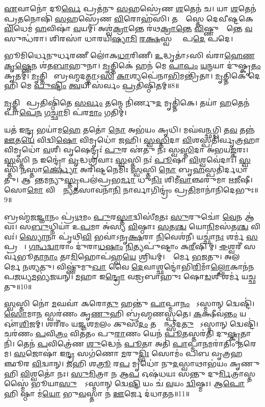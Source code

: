 \ul{𑌏}𑌵𑌾𑌨𑍋॑ 𑌦𑍂\ul{𑌰𑍍𑌵𑍇} 𑌪𑍍𑌰𑌤॑𑌨𑍁 \ul{𑌸}𑌹𑌸𑍍𑌰𑍇॑𑌣 \ul{𑌶}𑌤𑍇𑌨॑ 𑌚। 
𑌯𑌾 \ul{𑌶}𑌤𑍇𑌨॑ 𑌪𑍍𑌰\ul{𑌤}𑌨𑍋𑌷𑌿॑ \ul{𑌸}𑌹𑌸𑍍𑌰𑍇॑𑌣 \ul{𑌵𑌿}𑌰𑍋𑌹॑𑌸𑌿। 
𑌤𑌸𑍍𑌯𑌾᳚𑌸𑍍𑌤𑍇 𑌦𑍇𑌵𑍀𑌷𑍍𑌟𑌕𑍇 \ul{𑌵𑌿}𑌧𑍇𑌮॑ \ul{𑌹}𑌵𑌿𑌷𑌾॑ \ul{𑌵}𑌯𑌮𑍍। 
𑌅𑌶𑍍𑌵॑\ul{𑌕𑍍𑌰𑌾}𑌨𑍍𑌤𑍇 𑌰॑𑌥\ul{𑌕𑍍𑌰𑌾}\ul{𑌨𑍍𑌤𑍇} \ul{𑌵𑌿}𑌷𑍍𑌣𑍁𑌕𑍍𑌰𑌾᳚𑌨𑍍𑌤𑍇 \ul{𑌵}𑌸𑍁𑌨𑍍𑌧॑𑌰𑌾। 
𑌶𑌿𑌰𑌸𑌾॑ 𑌧𑌾𑌰𑌯𑌿\ul{𑌷𑍍𑌯𑌾}\ul{𑌮𑌿} \ul{𑌰}\ul{𑌕𑍍𑌷}𑌸𑍍𑌵 𑌮𑌾𑌂᳚ 𑌪\ul{𑌦𑍇} 𑌪𑌦𑍇।

 𑌭𑍂𑌮𑌿𑌰𑍍𑌧𑍇𑌨𑍁𑌰𑍍𑌧𑌰𑌣𑍀 𑌲𑍋॑𑌕\ul{𑌧𑌾}𑌰𑌿𑌣𑍀। 
 \ul{𑌉}𑌦𑍍𑌧𑍃𑌤𑌾॑𑌽𑌸𑌿 𑌵॑𑌰𑌾\ul{𑌹𑍇}\ul{𑌣} \ul{𑌕𑍃}\ul{𑌷𑍍𑌣𑍇}𑌨 𑌶॑𑌤\ul{𑌬𑌾}𑌹𑍁𑌨𑌾। 
 \ul{𑌮𑍃}𑌤𑍍𑌤𑌿𑌕𑍇॑ 𑌹𑌨॑ 𑌮𑍇 \ul{𑌪𑌾}\ul{𑌪𑌂} \ul{𑌯}\ul{𑌨𑍍𑌮}𑌯𑌾 𑌦𑍁॑𑌷𑍍𑌕𑍃\ul{𑌤𑌂} 𑌕𑍃𑌤𑌮𑍍। 
 \ul{𑌮𑍃}𑌤𑍍𑌤𑌿𑌕𑍇᳚ 𑌬𑍍𑌰𑌹𑍍𑌮𑌦\ul{𑌤𑍍𑌤𑌾}𑌽\ul{𑌸𑌿} \ul{𑌕𑌾}𑌶𑍍𑌯𑌪𑍇॑𑌨𑌾\ul{𑌭𑌿}𑌮𑌨𑍍𑌤𑍍𑌰𑌿॑𑌤𑌾। 
 \ul{𑌮𑍃}𑌤𑍍𑌤𑌿𑌕𑍇॑ 𑌦𑍇𑌹𑌿॑ 𑌮𑍇 \ul{𑌪𑍁}\ul{𑌷𑍍𑌟𑌿𑌂} \ul{𑌤𑍍𑌵}𑌯𑌿 𑌸॑𑌰𑍍𑌵𑌂 \ul{𑌪𑍍𑌰}𑌤𑌿𑌷𑍍𑌠𑌿॑𑌤𑌮𑍍॥8॥
 
 \ul{𑌮𑍃}𑌤𑍍𑌤𑌿𑌕𑍇᳚ 𑌪𑍍𑌰𑌤𑌿𑌷𑍍𑌠𑌿॑𑌤𑍇 \ul{𑌸}\ul{𑌰𑍍𑌵𑌂} \ul{𑌤}𑌨𑍍𑌮𑍇 𑌨𑌿॑𑌰𑍍𑌣𑍁\ul{𑌦} 𑌮𑍃𑌤𑍍𑌤𑌿॑𑌕𑍇। 
 𑌤𑌯𑌾॑ \ul{𑌹}𑌤𑍇𑌨॑ 𑌪𑌾\ul{𑌪𑍇}\ul{𑌨} \ul{𑌗}\ul{𑌚𑍍𑌛𑌾}𑌮𑌿 𑌪॑𑌰\ul{𑌮𑌾𑌂} 𑌗𑌤𑌿𑌮𑍍।

𑌯𑌤॑ 𑌇\ul{𑌨𑍍𑌦𑍍𑌰} 𑌭𑌯𑌾॑𑌮\ul{𑌹𑍇} 𑌤𑌤𑍋॑ \ul{𑌨𑍋} 𑌅𑌭॑𑌯𑌂 𑌕𑍃𑌧𑌿। 
𑌮𑌘॑𑌵\ul{𑌨𑍍𑌛}𑌗𑍍𑌧𑌿 𑌤\ul{𑌵} 𑌤𑌨𑍍𑌨॑ \ul{𑌊}𑌤\ul{𑌯𑍇} 𑌵𑌿𑌦𑍍𑌵𑌿\ul{𑌷𑍋} 𑌵𑌿𑌮𑍃𑌧𑍋॑ 𑌜𑌹𑌿। 
\ul{𑌸𑍍𑌵}\ul{𑌸𑍍𑌤𑌿}𑌦𑌾 \ul{𑌵𑌿}𑌶𑌸𑍍𑌪𑌤𑌿॑𑌰𑍍𑌵𑍃\ul{𑌤𑍍𑌰}𑌹𑌾 𑌵𑌿𑌮𑍃𑌧𑍋॑ \ul{𑌵}𑌶𑍀। 
𑌵𑍃𑌷𑍇𑌨𑍍𑌦𑍍𑌰𑌃॑ \ul{𑌪𑍁}𑌰 𑌏॑𑌤𑍁 𑌨𑌃 𑌸𑍍𑌵\ul{𑌸𑍍𑌤𑌿}𑌦𑌾 𑌅॑𑌭𑌯\ul{𑌙𑍍𑌕}𑌰𑌃। 
\ul{𑌸𑍍𑌵}𑌸𑍍𑌤𑌿 \ul{𑌨} 𑌇𑌨𑍍𑌦𑍍𑌰𑍋॑ \ul{𑌵𑍃}𑌦𑍍𑌧𑌶𑍍𑌰॑𑌵𑌾𑌃 \ul{𑌸𑍍𑌵}𑌸𑍍𑌤𑌿 𑌨𑌃॑ \ul{𑌪𑍂}𑌷𑌾 \ul{𑌵𑌿}𑌶𑍍𑌵𑌵𑍇॑𑌦𑌾𑌃। 
\ul{𑌸𑍍𑌵}𑌸𑍍𑌤𑌿 \ul{𑌨}𑌸𑍍𑌤𑌾\ul{𑌰𑍍𑌕𑍍𑌷𑍍𑌯𑍋} 𑌅𑌰𑌿॑𑌷𑍍𑌟𑌨𑍇𑌮𑌿𑌃 \ul{𑌸𑍍𑌵}𑌸𑍍𑌤𑌿 \ul{𑌨𑍋} 𑌬𑍃\ul{𑌹}𑌸𑍍𑌪𑌤𑌿॑𑌰𑍍𑌦𑌧𑌾𑌤𑍁। 
𑌆𑌪𑌾᳚𑌨𑍍𑌤𑌮𑌨𑍍𑌯𑍁\ul{𑌸𑍍𑌤𑍃}𑌪𑌲॑𑌪𑍍𑌰𑌭\ul{𑌰𑍍𑌮𑌾} 𑌧𑍁\ul{𑌨𑌿𑌃} 𑌶𑌿𑌮𑍀॑\ul{𑌵𑌾}𑌞𑍍𑌛𑌰𑍁॑𑌮𑌾 𑌋\ul{𑌜𑍀}𑌷𑍀। 
𑌸𑍋\ul{𑌮𑍋} 𑌵𑌿𑌶𑍍𑌵𑌾᳚𑌨𑍍𑌯\ul{𑌤}𑌸𑌾𑌵𑌨𑌾॑\ul{𑌨𑌿} 𑌨𑌾𑌰𑍍𑌵𑌾𑌗𑌿𑌨𑍍𑌦𑍍𑌰𑌂॑ 𑌪𑍍𑌰\ul{𑌤𑌿}𑌮𑌾𑌨𑌾॑𑌨𑌿𑌦𑍇𑌭𑍁𑌃॥9॥

𑌬𑍍𑌰𑌹𑍍𑌮॑𑌜\ul{𑌜𑍍𑌞𑌾}𑌨𑌂 𑌪𑍍𑌰॑\ul{𑌥}𑌮𑌂 \ul{𑌪𑍁}𑌰\ul{𑌸𑍍𑌤𑌾}𑌦𑍍𑌵𑌿𑌸𑍀॑\ul{𑌮}𑌤𑌃 \ul{𑌸𑍁}𑌰𑍁𑌚𑍋॑ \ul{𑌵𑍇}𑌨 𑌆॑𑌵𑌃। 
𑌸\ul{𑌬𑍁}𑌧𑍍𑌨𑌿𑌯𑌾॑ 𑌉\ul{𑌪}𑌮𑌾 𑌅॑𑌸𑍍𑌯 \ul{𑌵𑌿}𑌷𑍍𑌠𑌾𑌃 \ul{𑌸}𑌤\ul{𑌶𑍍𑌚} 𑌯𑍋\ul{𑌨𑌿}𑌮𑌸॑𑌤\ul{𑌶𑍍𑌚} 𑌵𑌿𑌵𑌃॑। 
\ul{𑌸𑍍𑌯𑍋}𑌨𑌾 𑌪𑍃॑𑌥𑌿\ul{𑌵𑌿} 𑌭𑌵𑌾॑𑌽𑌨𑍃\ul{𑌕𑍍𑌷}𑌰𑌾 \ul{𑌨𑌿}𑌵𑍇𑌶॑𑌨𑍀। 
𑌯𑌚𑍍𑌛𑌾॑\ul{𑌨𑌃} 𑌶𑌰𑍍𑌮॑ \ul{𑌸}𑌪𑍍𑌰𑌥𑌾𑌃᳚। 
\ul{𑌗}\ul{𑌨𑍍𑌧}\ul{𑌦𑍍𑌵𑌾}𑌰𑌾𑌂 𑌦𑍁॑𑌰𑌾\ul{𑌧}\ar{}\ul{𑌷𑌾𑌂} \ul{𑌨𑌿}𑌤𑍍𑌯𑌪𑍁॑𑌷𑍍𑌟𑌾𑌂 𑌕\ul{𑌰𑍀}𑌷𑌿𑌣𑍀᳚𑌮𑍍। 
\ul{𑌈}𑌶𑍍𑌵𑌰𑍀॑ 𑌸𑌰𑍍𑌵॑𑌭𑍂\ul{𑌤𑌾}\ul{𑌨𑌾𑌂} 𑌤𑌾\ul{𑌮𑌿}𑌹𑍋𑌪॑𑌹𑍍𑌵\ul{𑌯𑍇} 𑌶𑍍𑌰𑌿𑌯𑌮𑍍। 
𑌶𑍍𑌰𑍀᳚𑌰𑍍𑌮𑍇 \ul{𑌭}𑌜𑌤𑍁। 
𑌅𑌲𑌕𑍍𑌷𑍍𑌮𑍀᳚𑌰𑍍𑌮𑍇 \ul{𑌨}𑌶𑍍𑌯𑌤𑍁। 
𑌵𑌿𑌷𑍍𑌣𑍁॑𑌮𑍁\ul{𑌖𑌾} 𑌵𑍈 \ul{𑌦𑍇}𑌵𑌾𑌶𑍍𑌛𑌨𑍍𑌦𑍋॑𑌭𑌿\ul{𑌰𑌿}𑌮𑌾𑌁\ul{𑌲𑍍𑌲𑍋}𑌕𑌾𑌨॑𑌨𑌪\-\ul{𑌜}𑌯𑍍𑌯\ul{𑌮}𑌭𑍍𑌯॑𑌜𑌯𑌨𑍍। 
\ul{𑌮}𑌹𑌾 𑌇\ul{𑌨𑍍𑌦𑍍𑌰𑍋} 𑌵𑌜𑍍𑌰𑌬𑌾𑌹𑍁𑌃 𑌷𑍋\ul{𑌡}𑌶𑍀 𑌶𑌰𑍍𑌮॑ 𑌯𑌚𑍍𑌛𑌤𑍁॥10॥

 \ul{𑌸𑍍𑌵}𑌸𑍍𑌤𑌿 𑌨𑍋॑ \ul{𑌮}𑌘𑌵𑌾॑ 𑌕𑌰𑍋\ul{𑌤𑍁} 𑌹𑌨𑍍𑌤𑍁॑ \ul{𑌪𑌾}𑌪𑍍𑌮𑌾\ul{𑌨𑌂} 𑌯𑍋᳚𑌽𑌸𑍍𑌮𑌾𑌨𑍍 𑌦𑍍𑌵𑍇𑌷𑍍𑌟𑌿॑। 
 \ul{𑌸𑍋}𑌮𑌾\ul{𑌨}\ul{} 𑌸𑍍𑌵𑌰॑𑌣𑌂 𑌕𑍃\ul{𑌣𑍁}𑌹𑌿 𑌬𑍍𑌰॑𑌹𑍍𑌮𑌣𑌸𑍍𑌪𑌤𑍇। 
 \ul{𑌕}𑌕𑍍𑌷𑍀𑌵॑\ul{𑌨𑍍𑌤𑌂} 𑌯 𑌔॑\ul{𑌶𑌿}𑌜𑌮𑍍। 
 𑌶𑌰𑍀॑𑌰𑌂 𑌯𑌜𑍍𑌞𑌶\ul{𑌮}𑌲𑌂 𑌕𑍁𑌸𑍀॑\ul{𑌦𑌂} 𑌤𑌸𑍍𑌮𑌿᳚𑌨𑍍𑌥𑍍𑌸𑍀𑌦\ul{𑌤𑍁} 𑌯𑍋᳚𑌽𑌸𑍍𑌮𑌾𑌨𑍍 𑌦𑍍𑌵𑍇𑌷𑍍𑌟𑌿॑। 
 𑌚𑌰॑𑌣𑌂 \ul{𑌪}𑌵𑌿\ul{𑌤𑍍𑌰𑌂} 𑌵𑌿𑌤॑𑌤𑌂 𑌪𑍁\ul{𑌰𑌾}𑌣𑌂 𑌯𑍇𑌨॑ \ul{𑌪𑍂}𑌤𑌸𑍍𑌤𑌰॑𑌤𑌿 𑌦𑍁\ul{𑌷𑍍𑌕𑍃}𑌤𑌾𑌨𑌿॑। 
 𑌤𑍇𑌨॑ \ul{𑌪}𑌵𑌿𑌤𑍍𑌰𑍇॑𑌣 \ul{𑌶𑍁}𑌦𑍍𑌧𑍇𑌨॑ \ul{𑌪𑍂}𑌤𑌾 𑌅𑌤𑌿॑ \ul{𑌪𑌾}𑌪𑍍𑌮𑌾\ul{𑌨}𑌮𑌰𑌾॑𑌤𑌿𑌂 𑌤𑌰𑍇𑌮। 
 \ul{𑌸}𑌜𑍋𑌷𑌾॑ 𑌇\ul{𑌨𑍍𑌦𑍍𑌰} 𑌸𑌗॑𑌣𑍋 \ul{𑌮}𑌰𑍁\ul{𑌦𑍍𑌭𑌿𑌃} 𑌸𑍋𑌮𑌂॑ 𑌪𑌿𑌬 𑌵𑍃𑌤𑍍𑌰𑌹𑌞𑍍𑌛𑍂𑌰 \ul{𑌵𑌿}𑌦𑍍𑌵𑌾𑌨𑍍। 
 \ul{𑌜}𑌹𑌿 𑌶\ul{𑌤𑍍𑌰𑍂}\ul{} 𑌰\ul{𑌪} 𑌮𑍃𑌧𑍋॑ 𑌨𑍁\ul{𑌦}𑌸𑍍𑌵𑌾𑌥𑌾𑌭॑𑌯𑌂 𑌕𑍃𑌣𑍁𑌹𑌿 \ul{𑌵𑌿}𑌶𑍍𑌵𑌤𑍋॑ 𑌨𑌃। 
 \ul{𑌸𑍁}\ul{𑌮𑌿}𑌤𑍍𑌰𑌾 \ul{𑌨} 𑌆\ul{𑌪} 𑌓𑌷॑𑌧𑌯𑌃 𑌸𑌨𑍍𑌤𑍁 𑌦𑍁\ul{𑌰𑍍𑌮𑌿}𑌤𑍍𑌰𑌾𑌸𑍍𑌤𑌸𑍍𑌮𑍈॑ 𑌭𑍂𑌯𑌾\ul{𑌸𑍁}𑌰𑍍𑌯𑍋᳚𑌽𑌸𑍍𑌮𑌾𑌨𑍍 𑌦𑍍𑌵𑍇\ul{𑌷𑍍𑌟𑌿} 𑌯𑌂 𑌚॑ \ul{𑌵}𑌯𑌂 \ul{𑌦𑍍𑌵𑌿}𑌷𑍍𑌮𑌃। 
 𑌆\ul{𑌪𑍋} 𑌹𑌿 𑌷𑍍𑌠𑌾 𑌮॑\ul{𑌯𑍋} 𑌭𑍁\ul{𑌵}𑌸𑍍𑌤𑌾 𑌨॑ \ul{𑌊}𑌰𑍍𑌜𑍇 𑌦॑𑌧𑌾𑌤𑌨॥11॥
 
